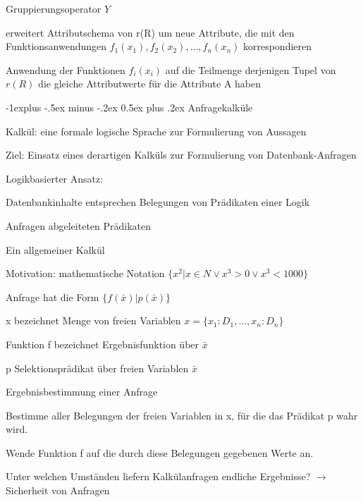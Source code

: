 \documentclass[a4paper]{article}
\makeatletter
\renewcommand{\subsection}{\@startsection{subsection}{2}{0mm}%
                                {-1explus -.5ex minus -.2ex}%
                                {0.5ex plus .2ex}%
                                {\normalfont\normalsize\bfseries}}
\makeatother
\begin{document}
\begin{multicols}{3}
Gruppierungsoperator $Y$
\begin{itemize*}
    \item erweitert Attributschema von r(R) um neue Attribute, die mit den Funktionsanwendungen $f_1 (x_1 ), f_2 (x_2 ),..., f_n (x_n )$ korrespondieren
    \item Anwendung der Funktionen $f_i (x_i)$ auf die Teilmenge derjenigen Tupel von $r(R)$ die gleiche Attributwerte für die Attribute A haben
\end{itemize*}

\subsection{Anfragekalküle}
\begin{itemize*}
    \item Kalkül: eine formale logische Sprache zur Formulierung von Aussagen
    \item Ziel: Einsatz eines derartigen Kalküls zur Formulierung von Datenbank-Anfragen
    \item Logikbasierter Ansatz:
    \begin{itemize*}
        \item Datenbankinhalte entsprechen Belegungen von Prädikaten einer Logik
        \item Anfragen abgeleiteten Prädikaten
    \end{itemize*}
\end{itemize*}

Ein allgemeiner Kalkül
\begin{itemize*}
    \item Motivation: mathematische Notation $\{x^2 | x \in N \vee x^3 > 0 \vee x^3 < 1000\}$
    \item Anfrage hat die Form $\{f(\bar{x}) | p(\bar{x})\}$
    \begin{itemize*}
        \item x bezeichnet Menge von freien Variablen $x = \{x_1:D_1,...,x_n:D_n\}$
        \item Funktion f bezeichnet Ergebnisfunktion über $\bar{x}$
        \item p Selektionsprädikat über freien Variablen $\bar{x}$
    \end{itemize*}
    \item Ergebnisbestimmung einer Anfrage
    \begin{itemize*}
        \item Bestimme aller Belegungen der freien Variablen in x, für die das Prädikat p wahr wird.
        \item Wende Funktion f auf die durch diese Belegungen gegebenen Werte an.
    \end{itemize*}
    \item Unter welchen Umständen liefern Kalkülanfragen endliche Ergebnisse? $\rightarrow$ Sicherheit von Anfragen
\end{itemize*}


\end{multicols}
\end{document}
